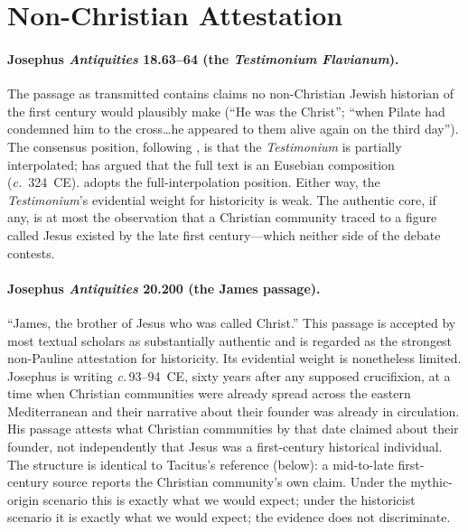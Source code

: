 \documentclass[12pt,oneside]{article}
\newcommand{\circa}{\textit{c.}\,}
\begin{document}
\section{Non-Christian Attestation}

\paragraph{Josephus \textit{Antiquities} 18.63--64 (the
\textit{Testimonium Flavianum}).}
The passage as transmitted contains claims no non-Christian Jewish
historian of the first century would plausibly make
(\enquote{He was the Christ}; \enquote{when Pilate had condemned
him to the cross\ldots he appeared to them alive again on the
third day}).  The consensus position, following
\citet{Meier1991,Ehrman2012}, is that the \textit{Testimonium} is
partially interpolated; \citet{Olson1999} has argued that the full
text is an Eusebian composition (\textit{c.}~324~CE).
\citet{Carrier2014} adopts the full-interpolation position.
Either way, the \textit{Testimonium}'s evidential weight for
historicity is weak.  The authentic core, if any, is at most the
observation that a Christian community traced to a figure called
Jesus existed by the late first century---which neither side of
the debate contests.

\paragraph{Josephus \textit{Antiquities} 20.200 (the James
passage).}
\enquote{James, the brother of Jesus who was called Christ.}
This passage is accepted by most textual scholars as substantially
authentic and is regarded as the strongest non-Pauline attestation
for historicity.  Its evidential weight is nonetheless limited.
Josephus is writing \circa 93--94~CE, sixty years after any
supposed crucifixion, at a time when Christian communities were
already spread across the eastern Mediterranean and their
narrative about their founder was already in circulation.  His
passage attests what Christian communities by that date claimed
about their founder, not independently that Jesus was a
first-century historical individual.  The structure is identical
to Tacitus's reference (below): a mid-to-late first-century source
reports the Christian community's own claim.  Under the
mythic-origin scenario this is exactly what we would expect;
under the historicist scenario it is exactly what we would expect;
the evidence does not discriminate.
\end{document}
